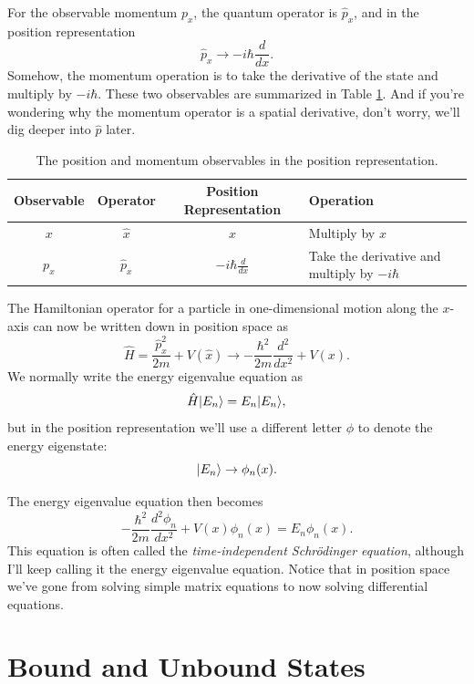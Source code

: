 For the observable momentum $p_x$, the quantum operator is $\hat{p}_x$, and in the position representation
\begin{equation}
\hat{p}_x \to -i\hbar \frac{d}{dx}.
\end{equation}
Somehow, the momentum operation is to take the derivative of the state and multiply by $-i\hbar$.  These two observables are summarized in Table \ref{tab_x_and_p}.  And if you're wondering why the momentum operator is a spatial derivative, don't worry, we'll dig deeper into $\hat{p}$ later.

\begin{table}
\centering
\begin{tabular}{c c c m{1in}}
Observable & Operator & Position Representation & Operation \\
\hline
$x$ & $\hat{x}$ & $x$ & Multiply by $x$ \\[3pt]
$p_x$ & $\hat{p}_x$ & $-i\hbar \frac{d}{dx}$ & Take the derivative and multiply by $-i\hbar$ \\
\hline
\end{tabular}
\caption{The position and momentum observables in the position representation.}
\label{tab_x_and_p}
\end{table}

The Hamiltonian operator for a particle in one-dimensional motion along the $x$-axis can now be written down in position space as
\begin{equation}
\boxed{
\hat{H} = \frac{\hat{p}_x^2}{2m} + V(\hat{x}) \to -\frac{\hbar^2}{2m} \frac{d^2}{dx^2} + V(x).
}
\end{equation}
We normally write the energy eigenvalue equation as
\[
\hat{H} | E_n \rangle = E_n | E_n \rangle,
\]
but in the position representation we'll use a different letter $\phi$ to denote the energy eigenstate:
\[
| E_n \rangle \to \phi_n(x).
\]

The energy eigenvalue equation then becomes
\begin{equation}
\label{eq_eee_1d}
\boxed{
-\frac{\hbar^2}{2m} \frac{d^2 \phi_n}{dx^2} + V(x)\phi_n(x) = E_n \phi_n(x).
}
\end{equation}
This equation is often called the \emph{time-independent Schr\"odinger equation}, although I'll keep calling it the energy eigenvalue equation.  Notice that in position space we've gone from solving simple matrix equations to now solving differential equations.


\section{Bound and Unbound States}

